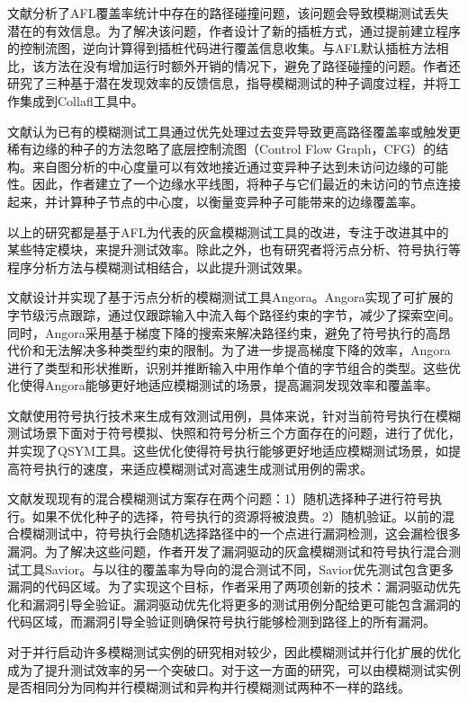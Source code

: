 \documentclass[master]{thesis-uestc}
\begin{document}
文献\cite{gan2018collafl}分析了AFL覆盖率统计中存在的路径碰撞问题，该问题会导致模糊测试丢失潜在的有效信息。为了解决该问题，作者设计了新的插桩方式，通过提前建立程序的控制流图，逆向计算得到插桩代码进行覆盖信息收集。与AFL默认插桩方法相比，该方法在没有增加运行时额外开销的情况下，避免了路径碰撞的问题。作者还研究了三种基于潜在发现效率的反馈信息，指导模糊测试的种子调度过程，并将工作集成到Collafl工具中。

文献\cite{she2022effective}认为已有的模糊测试工具通过优先处理过去变异导致更高路径覆盖率或触发更稀有边缘的种子的方法忽略了底层控制流图（Control Flow Graph，CFG）的结构。来自图分析的中心度量可以有效地接近通过变异种子达到未访问边缘的可能性。因此，作者建立了一个边缘水平线图，将种子与它们最近的未访问的节点连接起来，并计算种子节点的中心度，以衡量变异种子可能带来的边缘覆盖率。

以上的研究都是基于AFL为代表的灰盒模糊测试工具的改进，专注于改进其中的某些特定模块，来提升测试效率。除此之外，也有研究者将污点分析、符号执行等程序分析方法与模糊测试相结合，以此提升测试效果。

文献\cite{chen2018angora}设计并实现了基于污点分析的模糊测试工具Angora。Angora实现了可扩展的字节级污点跟踪，通过仅跟踪输入中流入每个路径约束的字节，减少了探索空间。同时，Angora采用基于梯度下降的搜索来解决路径约束，避免了符号执行的高昂代价和无法解决多种类型约束的限制。为了进一步提高梯度下降的效率，Angora进行了类型和形状推断，识别并推断输入中用作单个值的字节组合的类型。这些优化使得Angora能够更好地适应模糊测试的场景，提高漏洞发现效率和覆盖率。

文献\cite{yun2018qsym}使用符号执行技术来生成有效测试用例，具体来说，针对当前符号执行在模糊测试场景下面对于符号模拟、快照和符号分析三个方面存在的问题，进行了优化，并实现了QSYM工具。这些优化使得符号执行能够更好地适应模糊测试场景，如提高符号执行的速度，来适应模糊测试对高速生成测试用例的需求。

文献\cite{chen2020savior}发现现有的混合模糊测试方案存在两个问题：1）随机选择种子进行符号执行。如果不优化种子的选择，符号执行的资源将被浪费。2）随机验证。以前的混合模糊测试中，符号执行会随机选择路径中的一个点进行漏洞检测，这会漏检很多漏洞。为了解决这些问题，作者开发了漏洞驱动的灰盒模糊测试和符号执行混合测试工具Savior。与以往的覆盖率为导向的混合测试不同，Savior优先测试包含更多漏洞的代码区域。为了实现这个目标，作者采用了两项创新的技术：漏洞驱动优先化和漏洞引导全验证。漏洞驱动优先化将更多的测试用例分配给更可能包含漏洞的代码区域，而漏洞引导全验证则确保符号执行能够检测到路径上的所有漏洞。

对于并行启动许多模糊测试实例的研究相对较少，因此模糊测试并行化扩展的优化成为了提升测试效率的另一个突破口。对于这一方面的研究，可以由模糊测试实例是否相同分为同构并行模糊测试和异构并行模糊测试两种不一样的路线。
\end{document}
